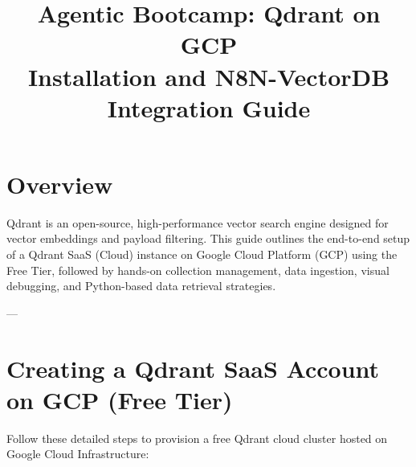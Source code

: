\documentclass[11pt,a4paper]{article}
\title{\textbf{Agentic Bootcamp: Qdrant on GCP \\
Installation and N8N-VectorDB Integration Guide}}
\author{}
\date{}
\begin{document}
\maketitle

\tableofcontents
\newpage

\section{Overview}
Qdrant is an open-source, high-performance vector search engine designed for vector embeddings and payload filtering. This guide outlines the end-to-end setup of a Qdrant SaaS (Cloud) instance on Google Cloud Platform (GCP) using the Free Tier, followed by hands-on collection management, data ingestion, visual debugging, and Python-based data retrieval strategies.

---

\section{Creating a Qdrant SaaS Account on GCP (Free Tier)}

Follow these detailed steps to provision a free Qdrant cloud cluster hosted on Google Cloud Infrastructure:
\end{document}
